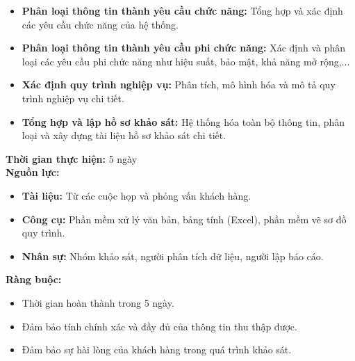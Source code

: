 {\begin{minipage}{\textwidth}
\begin{itemize}
\begin{itemize}
            \item \textbf{Phân loại thông tin thành yêu cầu chức năng:} Tổng hợp và xác định các yêu cầu chức năng của hệ thống.
            \item \textbf{Phân loại thông tin thành yêu cầu phi chức năng:} Xác định và phân loại các yêu cầu phi chức năng như hiệu suất, bảo mật, khả năng mở rộng,...
            \item \textbf{Xác định quy trình nghiệp vụ:} Phân tích, mô hình hóa và mô tả quy trình nghiệp vụ chi tiết.
            \item \textbf{Tổng hợp và lập hồ sơ khảo sát:} Hệ thống hóa toàn bộ thông tin, phân loại và xây dựng tài liệu hồ sơ khảo sát chi tiết.
        \end{itemize}
    \end{itemize}
    \vspace{0.5cm}
    \noindent \textbf{Thời gian thực hiện:} 5 ngày \\
    \noindent \textbf{Nguồn lực:}
    \begin{itemize}
        \item \textbf{Tài liệu:} Từ các cuộc họp và phỏng vấn khách hàng.
        \item \textbf{Công cụ:} Phần mềm xử lý văn bản, bảng tính (Excel), phần mềm vẽ sơ đồ quy trình.
        \item \textbf{Nhân sự:} Nhóm khảo sát, người phân tích dữ liệu, người lập báo cáo.
    \end{itemize}
    \vspace{0.5cm}
    \noindent \textbf{Ràng buộc:}
    \begin{itemize}
        \item Thời gian hoàn thành trong 5 ngày.
        \item Đảm bảo tính chính xác và đầy đủ của thông tin thu thập được.
        \item Đảm bảo sự hài lòng của khách hàng trong quá trình khảo sát.
    \end{itemize}
    \end{minipage}
}

\newpage %

